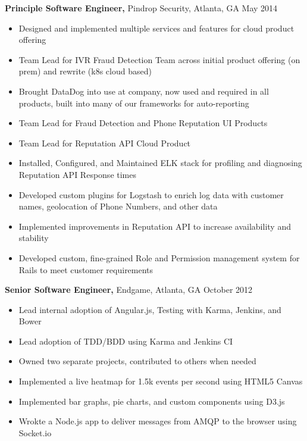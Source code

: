 \documentclass[margin]{res}
\begin{document}
\begin{resume}
    {\bf Principle Software Engineer,} Pindrop Security, Atlanta, GA \hfill May 2014
        \begin{itemize} \itemsep -2pt %
            \item Designed and implemented multiple services and features for
                cloud product offering
            \item Team Lead for IVR Fraud Detection Team across initial product
                offering (on prem) and rewrite (k8s cloud based)
            \item Brought DataDog into use at company, now used and required in
                all products, built into many of our frameworks for auto-reporting
            \item Team Lead for Fraud Detection and Phone Reputation UI Products
            \item Team Lead for Reputation API Cloud Product
            \item Installed, Configured, and Maintained ELK stack for profiling
                and diagnosing Reputation API Response times
            \item Developed custom plugins for Logstash to enrich log data with
                customer names, geolocation of Phone Numbers, and other data
            \item Implemented improvements in Reputation API to increase
                availability and stability
            \item Developed custom, fine-grained Role and Permission management
                system for Rails to meet customer requirements
        \end{itemize}

    {\bf Senior Software Engineer,} Endgame, Atlanta, GA \hfill October 2012
        \begin{itemize} \itemsep -2pt %
            \item Lead internal adoption of Angular.js, Testing with Karma,
                Jenkins, and Bower
            \item Lead adoption of TDD/BDD using Karma and Jenkins CI
            \item Owned two separate projects, contributed to others when
                needed
            \item Implemented a live heatmap for 1.5k events per second using HTML5 Canvas
            \item Implemented bar graphs, pie charts, and custom components using D3.js
            \item Wrokte a Node.js app to deliver messages from AMQP to the browser using
                Socket.io
        \end{itemize}


\end{resume}
\end{document}
